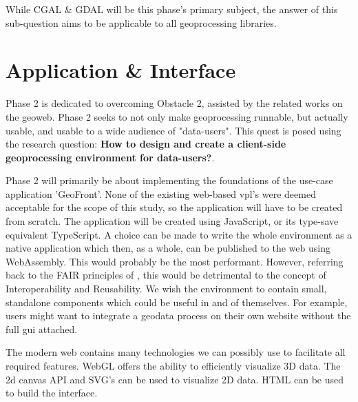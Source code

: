While CGAL \& GDAL will be this phase's primary subject, the answer of this sub-question aims to be applicable to all geoprocessing libraries. 


\section{Application \& Interface}
\label{sec:method-two}

\mySubRQTwo


Phase 2 is dedicated to overcoming Obstacle 2, assisted by the related works on the geoweb. Phase 2 seeks to not only make geoprocessing runnable, but actually usable, and usable to a wide audience of "data-users". This quest is posed using the research question: \textbf{How to design and create a client-side geoprocessing environment for data-users?}. 

Phase 2 will primarily be about implementing the foundations of the use-case application 'GeoFront'. None of the existing web-based \ac{vpl}'s were deemed acceptable for the scope of this study, so the application will have to be created from scratch. 
The application will be created using JavaScript, or its type-save equivalent TypeScript. 
A choice can be made to write the whole environment as a native application which then, as a whole, can be published to the web using WebAssembly. 
This would probably be the most performant. 
However, referring back to the FAIR principles of \cite{mark_d_wilkinson_fair_2016}, this would be detrimental to the concept of Interoperability and Reusability. 
We wish the environment to contain small, standalone components which could be useful in and of themselves. 
For example, users might want to integrate a geodata process on their own website without the full \ac{gui} attached.

The modern web contains many technologies we can possibly use to facilitate all required features. WebGL offers the ability to efficiently visualize 3D data. The 2d canvas API and SVG's can be used to visualize 2D data. HTML can be used to build the interface.

